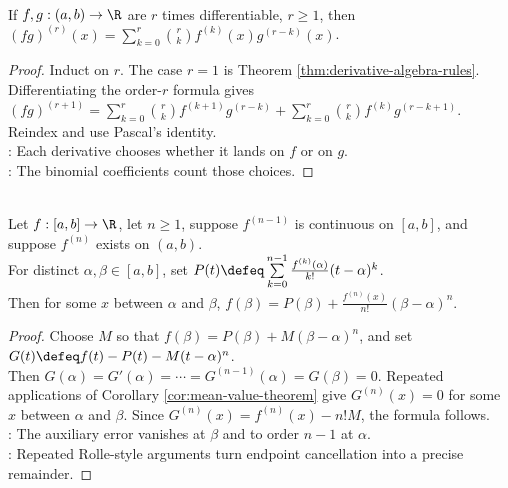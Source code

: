\begin{theorem} \label{thm:higher-order-leibniz-product-rule} \\
If $f,g:(a,b)\to\R$ are $r$ times differentiable, $r\geq1$, then $(fg)^{(r)}(x)=\sum\limits_{k=0}^{r}\binom{r}{k}f^{(k)}(x)g^{(r-k)}(x)$.
\begin{proof}
Induct on $r$. The case $r=1$ is Theorem \ref{thm:derivative-algebra-rules}.\\
Differentiating the order-$r$ formula gives $(fg)^{(r+1)} =\sum\limits_{k=0}^{r}\binom{r}{k}f^{(k+1)}g^{(r-k)} + \sum\limits_{k=0}^{r}\binom{r}{k}f^{(k)}g^{(r-k+1)}$.\\
Reindex and use Pascal's identity.\\
: Each derivative chooses whether it lands on $f$ or on $g$.\\
: The binomial coefficients count those choices.
\end{proof}
\end{theorem}

\begin{theorem} \label{thm:taylor-theorem-lagrange-remainder} \\
Let $f:[a,b]\to\R$, let $n\geq1$, suppose $f^{(n-1)}$ is continuous on $[a,b]$, and suppose $f^{(n)}$ exists on $(a,b)$.\\
For distinct $\alpha,\beta\in[a,b]$, set $P(t)\defeq\sum\limits_{k=0}^{n-1}\frac{f^{(k)}(\alpha)}{k!}(t-\alpha)^k$.\\
Then for some $x$ between $\alpha$ and $\beta$, $f(\beta)=P(\beta)+\frac{f^{(n)}(x)}{n!}(\beta-\alpha)^n$.
\begin{proof}
Choose $M$ so that $f(\beta)=P(\beta)+M(\beta-\alpha)^n$, and set $G(t)\defeq f(t)-P(t)-M(t-\alpha)^n$.\\
Then $G(\alpha)=G'(\alpha)=\cdots=G^{(n-1)}(\alpha)=G(\beta)=0$. Repeated applications of Corollary \ref{cor:mean-value-theorem} give $G^{(n)}(x)=0$ for some $x$ between $\alpha$ and $\beta$. Since $G^{(n)}(x)=f^{(n)}(x)-n!M$, the formula follows.\\
: The auxiliary error vanishes at $\beta$ and to order $n-1$ at $\alpha$.\\
: Repeated Rolle-style arguments turn endpoint cancellation into a precise remainder.
\end{proof}
\end{theorem}

